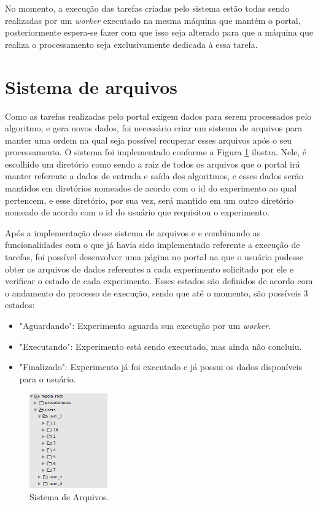 \documentclass[tg]{mdtufsm}
\begin{document}
No momento, a execução das tarefas criadas pelo sistema estão todas sendo realizadas por um \emph{worker} executado na mesma máquina que mantém o portal, posteriormente espera-se fazer com que isso seja alterado para que a máquina que realiza o processamento seja exclusivamente dedicada à essa tarefa.


\section{Sistema de arquivos}

Como as tarefas realizadas pelo portal exigem dados para serem processados pelo algoritmo, e gera novos dados, foi necessário criar um sistema de arquivos para manter uma ordem na qual seja possível recuperar esses arquivos após o seu processamento.
O sistema foi implementado conforme a Figura  \ref{fig:filesystem} ilustra. Nele, é escolhido um diretório como sendo a raiz de todos os arquivos que o portal irá manter referente a dados de entrada e saída dos algoritmos, e esses dados serão mantidos em diretórios nomeados de acordo com o id do experimento ao qual pertencem, e esse diretório, por sua vez, será mantido em um outro diretório nomeado de acordo com o id do usuário que requisitou o experimento.

Após a implementação desse sistema de arquivos e e combinando as funcionalidades com o que já havia sido implementado referente a execução de tarefas, foi possível desenvolver uma página no portal na que o usuário pudesse obter os arquivos de dados referentes a cada experimento solicitado por ele e verificar o estado de cada experimento. Esses estados são definidos de acordo com o andamento do processo de execução, sendo que até o momento, são possíveis 3 estados: 




\begin{itemize}
	\item "Aguardando": Experimento aguarda sua execução por um \emph{worker}.
	\item "Executando": Experimento está sendo executado, mas ainda não concluiu.
	\item "Finalizado": Experimento já foi executado e já possui os dados disponíveis para o usuário.
\end{itemize}

\begin{figure}
	\centering
	\includegraphics[width=0.3\textwidth]{filesystem}
	\caption{
		Sistema de Arquivos.
	}
	\label{fig:filesystem}
\end{figure}
\end{document}
